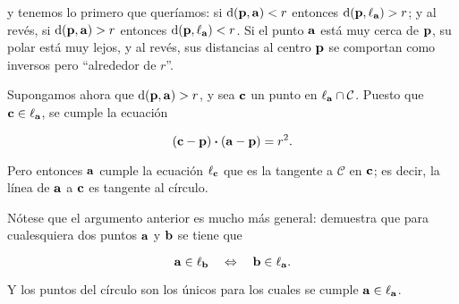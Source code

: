 \documentclass{article}
\theoremstyle{definicion}
\theoremstyle{definition}             %
\theoremstyle{definition}             %
\theoremstyle{definition}
\theoremstyle{definition}
\theoremstyle{observacion}
\theoremstyle{definition}
\theoremstyle{plain}
\theoremstyle{definition}
\theoremstyle{afirmacion}
\theoremstyle{notation}
\theoremstyle{definition}
\begin{document}
    y tenemos lo primero que queríamos: si \(\textrm{d}(\vb{p}, \vb{a}) < r\) entonces \(\textrm{d}(\vb{p}, \ell_{\vb{a}}) > r\); y al revés, si \(\textrm{d}(\vb{p}, \vb{a}) > r\) entonces \(\textrm{d}(\vb{p}, \ell_{\vb{a}}) < r\). Si el punto \(\vb{a}\) está muy cerca de \(\vb{p}\), su polar está muy lejos, y al revés, sus distancias al centro \(\vb{p}\) se comportan como inversos pero ``alrededor de \(r\)''.

    Supongamos ahora que \(\textrm{d}(\vb{p}, \vb{a}) > r\), y sea \(\vb{c}\) un punto en \(\ell_{\vb{a}} \cap \mathcal{C}\). Puesto que \(\vb{c} \in \ell_{\vb{a}}\), se cumple la ecuación 

    \begin{equation*}
        (\vb{c} - \vb{p}) \vdot (\vb{a} - \vb{p}) = r^{2}.
    \end{equation*}

    Pero entonces \(\vb{a}\) cumple la ecuación \(\ell_{\vb{c}}\) que es la tangente a \(\mathcal{C}\) en \(\vb{c}\); es decir, la línea de \(\vb{a}\) a \(\vb{c}\) es tangente al círculo.

    Nótese que el argumento anterior es mucho más general: demuestra que para cualesquiera dos puntos \(\vb{a}\) y \(\vb{b}\) se tiene que 

    \begin{equation*}
        \vb{a} \in \ell_{\vb{b}}\quad \Leftrightarrow\quad \vb{b} \in \ell_{\vb{a}}.
    \end{equation*}

    Y los puntos del círculo son los únicos para los cuales se cumple \(\vb{a} \in \ell_{\vb{a}}\).
\end{document}
